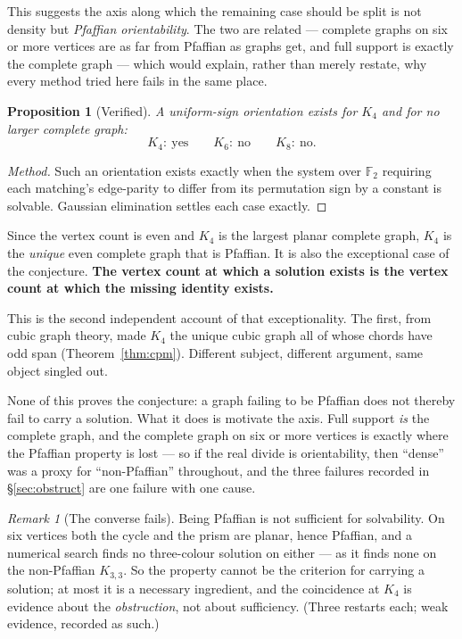 \documentclass[11pt]{article}
\newtheorem{proposition}[theorem]{Proposition}
\theoremstyle{definition}
\theoremstyle{remark}
\newtheorem{remark}[theorem]{Remark}
\begin{document}
This suggests the axis along which the remaining case should be split is not density
but \emph{Pfaffian orientability}. The two are related --- complete graphs on six or
more vertices are as far from Pfaffian as graphs get, and full support is exactly the
complete graph --- which would explain, rather than merely restate, why every method
tried here fails in the same place.

\begin{proposition}[Verified]
A uniform-sign orientation exists for $K_4$ and for no larger complete graph:
\[
  K_4:\ \text{yes}\qquad K_6:\ \text{no}\qquad K_8:\ \text{no}.
\]
\end{proposition}

\begin{proof}[Method]
Such an orientation exists exactly when the system over $\mathbb{F}_2$ requiring each
matching's edge-parity to differ from its permutation sign by a constant is solvable.
Gaussian elimination settles each case exactly.
\end{proof}

\noindent Since the vertex count is even and $K_4$ is the largest planar complete
graph, $K_4$ is the \emph{unique} even complete graph that is Pfaffian. It is also
the exceptional case of the conjecture. \textbf{The vertex count at which a solution
exists is the vertex count at which the missing identity exists.}

This is the second independent account of that exceptionality. The first, from cubic
graph theory, made $K_4$ the unique cubic graph all of whose chords have odd span
(Theorem~\ref{thm:cpm}). Different subject, different argument, same object singled
out.

None of this proves the conjecture: a graph failing to be Pfaffian does not thereby
fail to carry a solution. What it does is motivate the axis. Full support \emph{is}
the complete graph, and the complete graph on six or more vertices is exactly where
the Pfaffian property is lost --- so if the real divide is orientability, then
``dense'' was a proxy for ``non-Pfaffian'' throughout, and the three failures
recorded in \S\ref{sec:obstruct} are one failure with one cause.

\begin{remark}[The converse fails]
Being Pfaffian is not sufficient for solvability. On six vertices both the cycle and
the prism are planar, hence Pfaffian, and a numerical search finds no three-colour
solution on either --- as it finds none on the non-Pfaffian $K_{3,3}$. So the
property cannot be the criterion for carrying a solution; at most it is a necessary
ingredient, and the coincidence at $K_4$ is evidence about the \emph{obstruction},
not about sufficiency. (Three restarts each; weak evidence, recorded as such.)
\end{remark}
\end{document}
